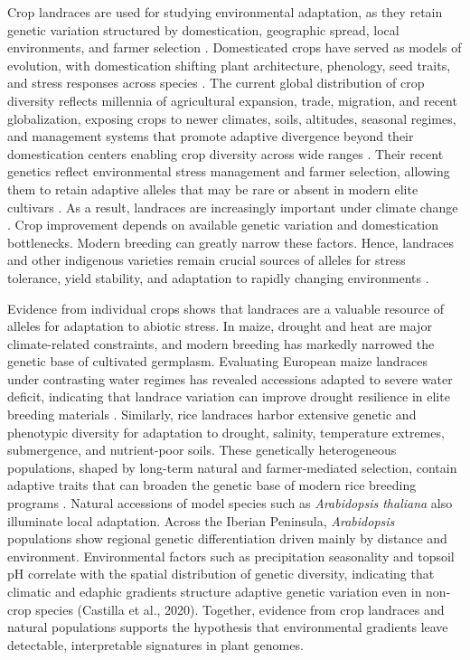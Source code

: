 \documentclass[unnumsec,webpdf,contemporary,large]{oup-authoring-template}%
\theoremstyle{thmstyleone}%
\theoremstyle{thmstyletwo}%
\theoremstyle{thmstylethree}%
\begin{document}
Crop landraces are used for studying environmental adaptation, as they retain genetic variation structured by domestication, geographic spread, local environments, and farmer selection \cite{Casanas2017Landrace,Lazaridi2024Landraces}. Domesticated crops have served as models of evolution, with domestication shifting plant architecture, phenology, seed traits, and stress responses across species \cite{Olsen2013CropAdaptation}. The current global distribution of crop diversity reflects millennia of agricultural expansion, trade, migration, and recent globalization, exposing crops to newer climates, soils, altitudes, seasonal regimes, and management systems that promote adaptive divergence beyond their domestication centers enabling crop diversity across wide ranges \cite{Gutaker2024CropSpread}. Their recent genetics reflect environmental stress management and farmer selection, allowing them to retain adaptive alleles that may be rare or absent in modern elite cultivars \cite{Casanas2017Landrace,Gao2023ClimateAdaptation}. As a result, landraces are increasingly important under climate change \cite{Gao2023ClimateAdaptation,Lazaridi2024Landraces}. Crop improvement depends on available genetic variation and domestication bottlenecks.  Modern breeding can greatly narrow these factors. Hence, landraces and other indigenous varieties remain crucial sources of alleles for stress tolerance, yield stability, and adaptation to rapidly changing environments \cite{Lazaridi2024Landraces}.


Evidence from individual crops shows that landraces are a valuable resource of alleles for adaptation to abiotic stress. In maize, drought and heat are major climate-related constraints, and modern breeding has markedly narrowed the genetic base of cultivated germplasm. Evaluating European maize landraces under contrasting water regimes has revealed accessions adapted to severe water deficit, indicating that landrace variation can improve drought resilience in elite breeding materials \cite{Santiago2025MaizeDrought}. Similarly, rice landraces harbor extensive genetic and phenotypic diversity for adaptation to drought, salinity, temperature extremes, submergence, and nutrient-poor soils. These genetically heterogeneous populations, shaped by long-term natural and farmer-mediated selection, contain adaptive traits that can broaden the genetic base of modern rice breeding programs \cite{Kou2026RiceLandraces}. Natural accessions of model species such as \textit{Arabidopsis thaliana} also illuminate local adaptation. Across the Iberian Peninsula, \textit{Arabidopsis} populations show regional genetic differentiation driven mainly by distance and environment. Environmental factors such as precipitation seasonality and topsoil pH correlate with the spatial distribution of genetic diversity, indicating that climatic and edaphic gradients structure adaptive genetic variation even in non-crop species (Castilla et al., 2020). Together, evidence from crop landraces and natural populations supports the hypothesis that environmental gradients leave detectable, interpretable signatures in plant genomes.
\end{document}
